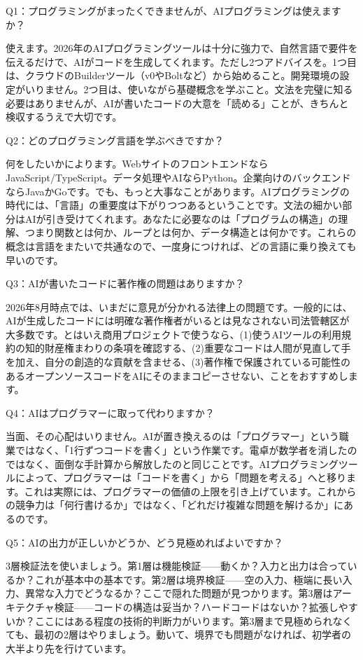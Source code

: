
Q1：プログラミングがまったくできませんが、AIプログラミングは使えますか？

使えます。2026年のAIプログラミングツールは十分に強力で、自然言語で要件を伝えるだけで、AIがコードを生成してくれます。ただし2つアドバイスを。1つ目は、クラウドのBuilderツール（v0やBoltなど）から始めること。開発環境の設定がいりません。2つ目は、使いながら基礎概念を学ぶこと。文法を完璧に知る必要はありませんが、AIが書いたコードの大意を「読める」ことが、きちんと検収するうえで大切です。

Q2：どのプログラミング言語を学ぶべきですか？

何をしたいかによります。WebサイトのフロントエンドならJavaScript/TypeScript。データ処理やAIならPython。企業向けのバックエンドならJavaかGoです。でも、もっと大事なことがあります。AIプログラミングの時代には、「言語」の重要度は下がりつつあるということです。文法の細かい部分はAIが引き受けてくれます。あなたに必要なのは「プログラムの構造」の理解、つまり関数とは何か、ループとは何か、データ構造とは何かです。これらの概念は言語をまたいで共通なので、一度身につければ、どの言語に乗り換えても早いのです。

Q3：AIが書いたコードに著作権の問題はありますか？

2026年8月時点では、いまだに意見が分かれる法律上の問題です。一般的には、AIが生成したコードには明確な著作権者がいるとは見なされない司法管轄区が大多数です。とはいえ商用プロジェクトで使うなら、(1)使うAIツールの利用規約の知的財産権まわりの条項を確認する、(2)重要なコードは人間が見直して手を加え、自分の創造的な貢献を含ませる、(3)著作権で保護されている可能性のあるオープンソースコードをAIにそのままコピーさせない、ことをおすすめします。

Q4：AIはプログラマーに取って代わりますか？

当面、その心配はいりません。AIが置き換えるのは「プログラマー」という職業ではなく、「1行ずつコードを書く」という作業です。電卓が数学者を消したのではなく、面倒な手計算から解放したのと同じことです。AIプログラミングツールによって、プログラマーは「コードを書く」から「問題を考える」へと移ります。これは実際には、プログラマーの価値の上限を引き上げています。これからの競争力は「何行書けるか」ではなく、「どれだけ複雑な問題を解けるか」にあるのです。

Q5：AIの出力が正しいかどうか、どう見極めればよいですか？

3層検証法を使いましょう。第1層は機能検証——動くか？入力と出力は合っているか？これが基本中の基本です。第2層は境界検証——空の入力、極端に長い入力、異常な入力でどうなるか？ここで隠れた問題が見つかります。第3層はアーキテクチャ検証——コードの構造は妥当か？ハードコードはないか？拡張しやすいか？ここにはある程度の技術的判断力がいります。第3層まで見極められなくても、最初の2層はやりましょう。動いて、境界でも問題がなければ、初学者の大半より先を行けています。

